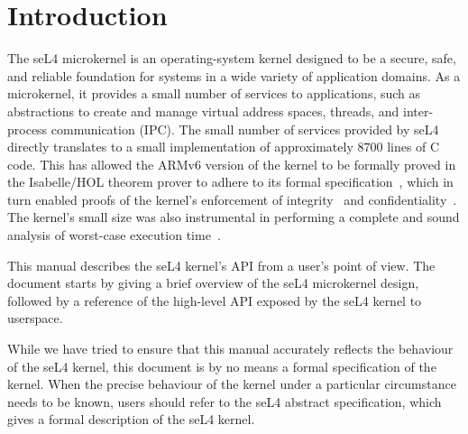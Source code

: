 %
%
%

\chapter{\label{ch:intro}Introduction}


The seL4 microkernel is an operating-system kernel designed to be
a secure, safe, and reliable foundation for systems in a wide variety of
application domains. As a microkernel, it provides a small number of
services to applications, such as abstractions to create and manage virtual address
spaces, threads, and inter-process communication (IPC). The small number
of services provided by seL4 directly translates to a small
implementation of approximately $8700$ lines of C code. This has allowed
the ARMv6 version of the kernel to be formally proved in the Isabelle/HOL
theorem prover to adhere to its formal
specification~\cite{Boyton_09,Cock_KS_08,Derrin_EKCC_06,Elkaduwe_GE_08,Klein_EHACDEEKNSTW_09,Tuch_KN_07,Winwood_KSACN_09},
which in turn enabled proofs of the kernel's enforcement of
integrity~\cite{Sewell_WGMAK_11} and
confidentiality~\cite{Murray_MBGBSLGK_13}. The kernel's small size was
also instrumental in performing a complete and sound analysis of
worst-case execution time~\cite{Blackham_SCRH_11,Blackham_SH_12}.

This manual describes the seL4 kernel's API from a user's point of view.
The document starts by giving a brief overview of the seL4 microkernel
design, followed by a reference of the high-level API exposed by the
seL4 kernel to userspace.

While we have tried to ensure that this manual accurately reflects the
behaviour of the seL4 kernel, this document is by no means a formal
specification of the kernel. When the precise behaviour of the kernel
under a particular circumstance needs to be known, users should refer to
the seL4 abstract specification, which
gives a formal description of the seL4 kernel.
